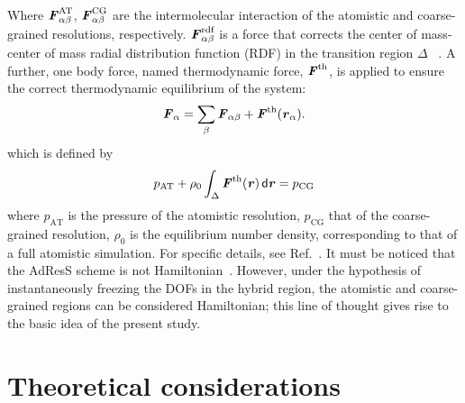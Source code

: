 \documentclass[aip,jcp,a4paper,reprint,onecolumn]{revtex4-1}
\newcommand{\vect}[1]{\textbf{\textit{#1}}}
\newcommand{\dd}[1]{\textsf{#1}}
\newcommand{\AT}{{\textrm{{AT}}}}
\newcommand{\CG}{{\textrm{CG}}}
\newcommand{\rdf}{{\textrm{rdf}}}
\begin{document}
Where $ \vect F^{\AT}_{\alpha\beta}$, $ \vect F^{\CG}_{\alpha\beta}$
are the intermolecular interaction of the atomistic and coarse-grained
resolutions, respectively.  $\vect F_{\alpha\beta}^{\rdf}$ is a force that corrects the center of mass-center of mass radial distribution function (RDF) in the transition region $\Delta$ ~\cite{rdfcorr}. A further, one body force, named thermodynamic force, ${\vect F}^{\textrm{th}}$, is applied to ensure the correct thermodynamic equilibrium of the system:
\begin{equation}
  {\vect F}_{\alpha}=
  \sum_{\beta}{\vect F}_{\alpha\beta}+
  {\vect F}^{\textrm{th}}(\vect r_\alpha).
\label{mody}
\end{equation}
which is defined by
\begin{equation}
  p_{\AT}+
  \rho_0
  \int_{\Delta} {\vect F}^\text{th}(\vect r)\,\dd d\vect r
  =p_{\CG}
  \label{thf}
\end{equation}
where $p_{\AT}$ is the pressure of the atomistic resolution, $p_{\CG}$ that of the coarse-grained resolution, $\rho_{0}$ is the equilibrium number density, corresponding to that of a full atomistic simulation.
For specific details, see Ref.~\cite{prlgc}. It must be noticed that the 
AdResS scheme is not Hamiltonian~\cite{presolo,prlcomm}. However, under the hypothesis of instantaneously
freezing the DOFs in the hybrid region, the atomistic and
coarse-grained regions can be considered Hamiltonian; this line of thought gives rise to the basic
idea of the present study.

\section{Theoretical considerations}
\end{document}
